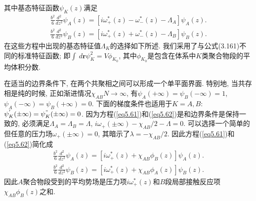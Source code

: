 其中基态特征函数$\psi_{K}(z)$满足
\label{subsec.equations}
    \begin{equation}
        \begin{aligned}
        \frac{b^{2}}{6}\frac{d^{2}}{dz^{2}}\psi_{A}(z)=[i\omega^{*}_{+}(z)-\omega^{*}_{-}(z)-\Lambda_{A}]\psi_{A}(z).
        \end{aligned}
        \label{eq5.61}
    \end{equation}
\label{subsec.equations}
    \begin{equation}
        \begin{aligned}
        \frac{b^{2}}{6}\frac{d^{2}}{dz^{2}}\psi_{B}(z)=[i\omega^{*}_{+}(z)+\omega^{*}_{-}(z)-\Lambda_{B}]\psi_{B}(z).
        \end{aligned}
        \label{eq5.62}
    \end{equation}
在这些方程中出现的基态特征值$\Lambda_{K}$的选择如下所述.
我们采用了与公式(3.161)不同的标准特征函数; 即$\int\
d\bm{r}\psi^{2}_{K}=V\phi_{K_{0}}$,
其中$\phi_{K_{0}}$是包含在体系中$K$类聚合物段的平均体积分数.
\par
在适当的边界条件下, 在两个共聚相之间可以形成一个单平面界面. 特别地,
当共存相是纯的时候, 正如渐进情况$\chi_{AB}N\longrightarrow \infty$,
有$\psi_{A}(+\infty)=\psi_{B}(-\infty)=1$,
$\psi_{A}(-\infty)=\psi_{B}(+\infty)=0$. 下面的梯度条件也适用于$K=A, B$:
$\psi^{'}_{K}(\pm\infty)=\psi^{"}_{K}(\pm\infty)=0$.
因为方程(\ref{eq5.61})和(\ref{eq5.62})是和边界条件是保持一致的,
必须满足$\Lambda_{A}=\Lambda_{B}=\Lambda$,
$i\omega_{+}(\pm\infty)-\chi_{AB}/2-\Lambda=0$.
可以选择一个简单的但任意的压力场$\omega_{+}(\pm\infty)=0$,
其暗示了$\lambda=-\chi_{AB}/2$. 因此方程(\ref{eq5.61})和(\ref{eq5.62})简化成
\label{subsec.equations}
    \begin{equation}
        \begin{aligned}
            \frac{b^{2}}{6}\frac{d^{2}}{dz^{2}}\psi_{A}(z)=[i\omega^{*}_{+}(z)+\chi_{AB}\phi_{B}(z)]\psi_{A}(z).
        \end{aligned}
        \label{eq5.63}
    \end{equation}
\label{subsec.equations}
    \begin{equation}
        \begin{aligned}
            \frac{b^{2}}{6}\frac{d^{2}}{dz^{2}}\psi_{B}(z)=[i\omega^{*}_{+}(z)+\chi_{AB}\phi_{A}(z)]\psi_{B}(z).
        \end{aligned}
        \label{eq5.64}
    \end{equation}
因此$A$聚合物段受到的平均势场是压力项$i\omega^{*}_{+}(z)$和$B$段局部接触反应项$\chi_{AB}\phi_{B}(z)$之和.
